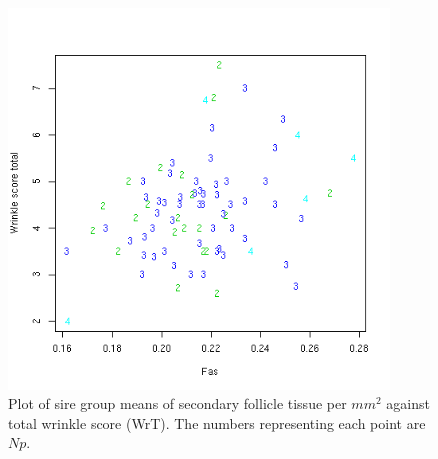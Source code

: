 %

\begin{figure}[!h]
  \centering
   \includegraphics[width=0.9\textwidth]{faswrt.png}
  \caption{Plot of sire group means  of secondary follicle tissue per $mm^{2}$ against total wrinkle score (WrT). The numbers representing each point are $Np$.}
  \label{fig:faswrt}
\end{figure}

%

